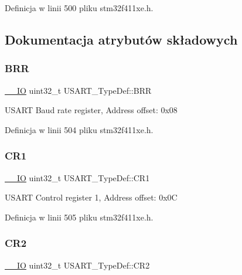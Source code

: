 Definicja w linii 500 pliku stm32f411xe.\+h.



\subsection{Dokumentacja atrybutów składowych}
\mbox{\label{struct_u_s_a_r_t___type_def_a6ef06ba9d8dc2dc2a0855766369fa7c9}} 
\subsubsection{\texorpdfstring{B\+RR}{BRR}}
{\footnotesize\ttfamily \hyperlink{core__sc300_8h_aec43007d9998a0a0e01faede4133d6be}{\+\_\+\+\_\+\+IO} uint32\+\_\+t U\+S\+A\+R\+T\+\_\+\+Type\+Def\+::\+B\+RR}

U\+S\+A\+RT Baud rate register, Address offset\+: 0x08 

Definicja w linii 504 pliku stm32f411xe.\+h.

\mbox{\label{struct_u_s_a_r_t___type_def_a6d7dcd3972a162627bc3470cbf992ec4}} 
\subsubsection{\texorpdfstring{C\+R1}{CR1}}
{\footnotesize\ttfamily \hyperlink{core__sc300_8h_aec43007d9998a0a0e01faede4133d6be}{\+\_\+\+\_\+\+IO} uint32\+\_\+t U\+S\+A\+R\+T\+\_\+\+Type\+Def\+::\+C\+R1}

U\+S\+A\+RT Control register 1, Address offset\+: 0x0C 

Definicja w linii 505 pliku stm32f411xe.\+h.

\mbox{\label{struct_u_s_a_r_t___type_def_aa7ede2de6204c3fc4bd9fb328801c99a}} 
\subsubsection{\texorpdfstring{C\+R2}{CR2}}
{\footnotesize\ttfamily \hyperlink{core__sc300_8h_aec43007d9998a0a0e01faede4133d6be}{\+\_\+\+\_\+\+IO} uint32\+\_\+t U\+S\+A\+R\+T\+\_\+\+Type\+Def\+::\+C\+R2}

